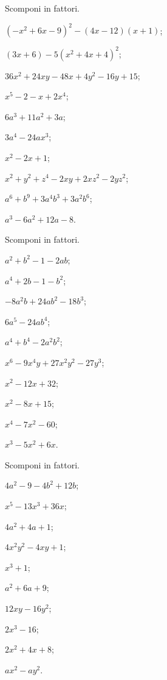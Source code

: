 \begin{esercizio}[\Ast]
 \label{ese:13.87}
 Scomponi in fattori.
\begin{multicols}{2}
 \begin{enumeratea}
\item $(-x^{2}+6x-9)^{2}-(4x-12)(x+1)$;
\item $(3x+6)-5(x^{2}+4x+4)^{2}$;
\item $36x^{2}+24xy-48x+4y^{2}-16y+15$;
\item $x^{5}-2-x+2x^{4}$;
\item $6a^{3}+11a^{2}+3a$;
\item $3a^{4}-24ax^{3}$;
\item $x^{2}-2x+1$;
\item $x^{2}+y^{2}+z^{4}-2xy+2{xz}^{2}-2{yz}^{2}$;
\item $a^{6}+b^{9}+3a^{4}b^{3}+3a^{2}b^{6}$;
\item $a^{3}-6a^{2}+12a-8$.
 \end{enumeratea}
\end{multicols}
\end{esercizio}

\begin{esercizio}
 \label{ese:13.88}
 Scomponi in fattori.
 \begin{multicols}{2}
 \begin{enumeratea}
 \item $a^{2}+b^{2}-1-2{ab}$;
\item $a^{4}+2b-1-b^{2}$;
\item $-8a^{2}b+24{ab}^{2}-18b^{3}$;
\item $6a^{5}-24{ab}^{4}$;
\item $a^{4}+b^{4}-2a^{2}b^{2}$;
\item $x^{6}-9x^{4}y+27x^{2}y^{2}-27y^{3}$;
\item $x^{2}-12x+32$;
\item $x^{2}-8x+15$;
\item $x^{4}-7x^{2}-60$;
\item $x^{3}-5x^{2}+6x$.
 \end{enumeratea}
 \end{multicols}
\end{esercizio}

\begin{esercizio}
 \label{ese:13.89}
 Scomponi in fattori.
 \begin{multicols}{3}
 \begin{enumeratea}
  \item $4a^{2}-9-4b^{2}+12b$;
\item $x^{5}-13x^{3}+36x$;
\item $4a^{2}+4a+1$;
\item $4x^{2}y^{2}-4xy+1$;
\item $x^{3}+1$;
\item $a^{2}+6a+9$;
\item $12xy-16y^{2}$;
\item $2x^{3}-16$;
\item $2x^{2}+4x+8$;
\item $ax^{2}-{ay}^{2}$.
 \end{enumeratea}
 \end{multicols}
\end{esercizio}

